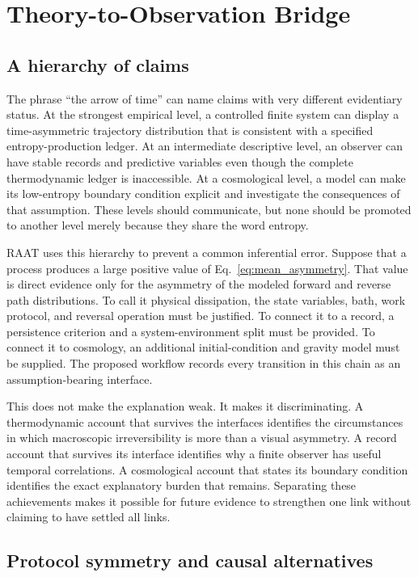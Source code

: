 \section{Theory-to-Observation Bridge}

\subsection{A hierarchy of claims}

The phrase ``the arrow of time'' can name claims with very different evidentiary status. At the strongest empirical level, a controlled finite system can display a time-asymmetric trajectory distribution that is consistent with a specified entropy-production ledger. At an intermediate descriptive level, an observer can have stable records and predictive variables even though the complete thermodynamic ledger is inaccessible. At a cosmological level, a model can make its low-entropy boundary condition explicit and investigate the consequences of that assumption. These levels should communicate, but none should be promoted to another level merely because they share the word entropy.

RAAT uses this hierarchy to prevent a common inferential error. Suppose that a process produces a large positive value of Eq.~\eqref{eq:mean_asymmetry}. That value is direct evidence only for the asymmetry of the modeled forward and reverse path distributions. To call it physical dissipation, the state variables, bath, work protocol, and reversal operation must be justified. To connect it to a record, a persistence criterion and a system-environment split must be provided. To connect it to cosmology, an additional initial-condition and gravity model must be supplied. The proposed workflow records every transition in this chain as an assumption-bearing interface.

This does not make the explanation weak. It makes it discriminating. A thermodynamic account that survives the interfaces identifies the circumstances in which macroscopic irreversibility is more than a visual asymmetry. A record account that survives its interface identifies why a finite observer has useful temporal correlations. A cosmological account that states its boundary condition identifies the exact explanatory burden that remains. Separating these achievements makes it possible for future evidence to strengthen one link without claiming to have settled all links.

\subsection{Protocol symmetry and causal alternatives}

